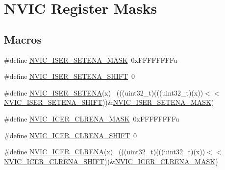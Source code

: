 \hypertarget{group___n_v_i_c___register___masks}{}\section{N\+V\+IC Register Masks}
\label{group___n_v_i_c___register___masks}
\subsection*{Macros}
\begin{DoxyCompactItemize}
\item 
\#define \hyperlink{group___n_v_i_c___register___masks_ga7e67471c208e3986c0cdd8e7e1319a30}{N\+V\+I\+C\+\_\+\+I\+S\+E\+R\+\_\+\+S\+E\+T\+E\+N\+A\+\_\+\+M\+A\+SK}~0x\+F\+F\+F\+F\+F\+F\+F\+Fu
\item 
\#define \hyperlink{group___n_v_i_c___register___masks_ga9965b5df5f4c6c8d3a1c8e89d03d9489}{N\+V\+I\+C\+\_\+\+I\+S\+E\+R\+\_\+\+S\+E\+T\+E\+N\+A\+\_\+\+S\+H\+I\+FT}~0
\item 
\#define \hyperlink{group___n_v_i_c___register___masks_gac70bcd8b1faa97c22828b5191e806522}{N\+V\+I\+C\+\_\+\+I\+S\+E\+R\+\_\+\+S\+E\+T\+E\+NA}(x)                                        ~(((uint32\+\_\+t)(((uint32\+\_\+t)(x))$<$$<$\hyperlink{group___n_v_i_c___register___masks_ga9965b5df5f4c6c8d3a1c8e89d03d9489}{N\+V\+I\+C\+\_\+\+I\+S\+E\+R\+\_\+\+S\+E\+T\+E\+N\+A\+\_\+\+S\+H\+I\+FT}))\&\hyperlink{group___n_v_i_c___register___masks_ga7e67471c208e3986c0cdd8e7e1319a30}{N\+V\+I\+C\+\_\+\+I\+S\+E\+R\+\_\+\+S\+E\+T\+E\+N\+A\+\_\+\+M\+A\+SK})
\item 
\#define \hyperlink{group___n_v_i_c___register___masks_gad8da511197e454095edbfeb501e8b2f5}{N\+V\+I\+C\+\_\+\+I\+C\+E\+R\+\_\+\+C\+L\+R\+E\+N\+A\+\_\+\+M\+A\+SK}~0x\+F\+F\+F\+F\+F\+F\+F\+Fu
\item 
\#define \hyperlink{group___n_v_i_c___register___masks_ga35b241c6ab2dbf18cf15503076dcb9a8}{N\+V\+I\+C\+\_\+\+I\+C\+E\+R\+\_\+\+C\+L\+R\+E\+N\+A\+\_\+\+S\+H\+I\+FT}~0
\item 
\#define \hyperlink{group___n_v_i_c___register___masks_ga3e88bf73edea1bb19a921edcffc6c52e}{N\+V\+I\+C\+\_\+\+I\+C\+E\+R\+\_\+\+C\+L\+R\+E\+NA}(x)                                        ~(((uint32\+\_\+t)(((uint32\+\_\+t)(x))$<$$<$\hyperlink{group___n_v_i_c___register___masks_ga35b241c6ab2dbf18cf15503076dcb9a8}{N\+V\+I\+C\+\_\+\+I\+C\+E\+R\+\_\+\+C\+L\+R\+E\+N\+A\+\_\+\+S\+H\+I\+FT}))\&\hyperlink{group___n_v_i_c___register___masks_gad8da511197e454095edbfeb501e8b2f5}{N\+V\+I\+C\+\_\+\+I\+C\+E\+R\+\_\+\+C\+L\+R\+E\+N\+A\+\_\+\+M\+A\+SK})

\end{DoxyCompactItemize}
